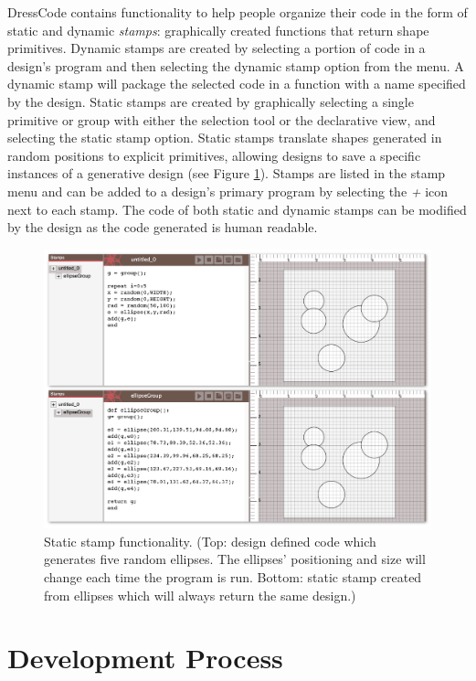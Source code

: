 \documentclass{sigchi}
\begin{document}
DressCode contains functionality to help people organize their code in the form of static and dynamic \textit{stamps}: graphically created functions that return shape primitives. Dynamic stamps are created by selecting a portion of code in a design's program and then selecting the dynamic stamp option from the menu. A dynamic stamp will package the selected code in a function with a name specified by the design. Static stamps are created by graphically selecting a single primitive or group with either the selection tool or the declarative view, and selecting the static stamp option. Static stamps translate shapes generated in random positions to explicit primitives, allowing designs to save a specific instances of a generative design (see Figure \ref{fig:stamps}).
Stamps are listed in the stamp menu and can be added to a design's primary program by selecting the \textit{+} icon next to each stamp. The code of both static and dynamic stamps can be modified by the design as the code generated is human readable.

\begin{center}
\begin{figure}[h!]
\includegraphics[width=\columnwidth]{images/stamps.jpg}
\caption{Static stamp functionality. (Top: design defined code which generates five random ellipses. The ellipses' positioning and size will change each time the program is run. Bottom: static stamp created from ellipses which will always return the same design.)}
\label{fig:stamps}
\end{figure}
\end{center}
\vspace{-20pt}
\section{Development Process}
\end{document}
